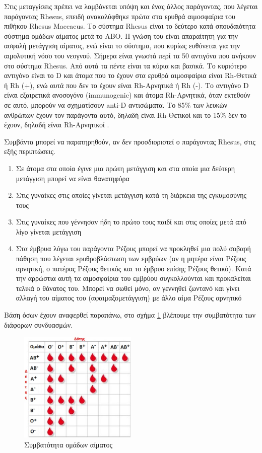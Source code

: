 			Στις μεταγγίσεις πρέπει να λαμβάνεται υπόψη και ένας άλλος
παράγοντας, που λέγεται παράγοντας Rhesus, επειδή ανακαλύφθηκε πρώτα στα ερυθρά
αιμοσφαίρια του πιθήκου Rhesus Maccacus. Το σύστημα Rhesus είναι το δεύτερο κατά
σπουδαιότητα σύστημα ομάδων αίματος μετά το ΑΒΟ. Η γνώση του είναι απαραίτητη για
την ασφαλή μετάγγιση αίματος, ενώ είναι το σύστημα, που κυρίως ευθύνεται για την
αιμολυτική νόσο του νεογνού. Σήμερα είναι γνωστά περί τα 50 αντιγόνα που ανήκουν στο
σύστημα Rhesus. Από αυτά τα πέντε είναι τα κύρια και βασικά. Το κυριότερο αντιγόνο είναι
το D και άτομα που το έχουν στα ερυθρά αιμοσφαίρια είναι Rh-Θετικά ή Rh (+), ενώ αυτά
που δεν το έχουν είναι Rh-Αρνητικά ή Rh (-). Το αντιγόνο D είναι εξαιρετικά ανοσογόνο
(immunogenic) και άτομα Rh-Αρνητικά, όταν εκτεθούν σε αυτό, μπορούν να σχηματίσουν
anti-D αντισώματα. Το 85\% των λευκών ανθρώπων έχουν τον παράγοντα αυτό, δηλαδή είναι
Rh-Θετικοί και το 15\% δεν το έχουν, δηλαδή είναι Rh-Αρνητικοί \cite{Landsteiner01011940}. 

Συμβάντα μπορεί να παρατηρηθούν, αν δεν προσδιοριστεί ο παράγοντας Rhesus, στις εξής
περιπτώσεις.
\begin{enumerate}
	\item Σε άτομα στα οποία έγινε μια πρώτη μετάγγιση και στα οποία μια δεύτερη μετάγγιση μπορεί να είναι θανατηφόρα
	\item Στις γυναίκες στις οποίες γίνεται μετάγγιση κατά τη διάρκεια της εγκυμοσύνης τους
	\item Στις γυναίκες που γέννησαν ήδη το πρώτο τους παιδί και στις οποίες μετά από λίγο γίνεται μετάγγιση
	\item Στα έμβρυα λόγω του παράγοντα Ρέζους μπορεί να προκληθεί μια πολύ σοβαρή πάθηση που λέγεται ερυθροβλάστωση των εμβρύων (αν η μητέρα είναι Ρέζους αρνητική, ο πατέρας Ρέζους θετικός και το έμβρυο επίσης Ρέζους θετικό). Κατά την αρρώστια αυτή τα αιμοσφαίρια του εμβρύου συγκολλούνται και προκαλείται τελικά ο θάνατος του. Μπορεί να σωθεί μόνο, αν γεννηθεί ζωντανό και γίνει αλλαγή του αίματος του (αφαιμαξομετάγγιση) με άλλο αίμα Ρέζους αρνητικό
\end{enumerate}

Βάση όσων έχουν αναφερθεί παραπάνω, στο σχήμα \ref{fig:blood_compatibility} βλέπουμε την συμβατότητα των διάφορων συνδυασμών.
	\begin{figure}[h!]
	    \centering
	    \includegraphics[width=0.5\textwidth]{blood_compatibility.jpg}
	    \caption{Συμβατότητα ομάδων αίματος}
	    \label{fig:blood_compatibility}
	\end{figure}
	
